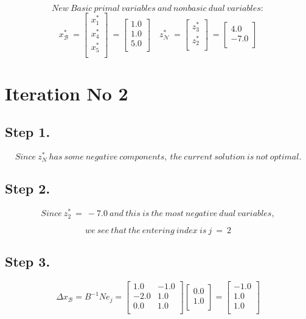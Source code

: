 \documentclass [12pt] {article}
\begin{document}
\[
New\ Basic\ primal\ variables\ and\ nonbasic\ dual\ variables:
\]
\[
x_{\mathcal B}^{*}\ =\begin{bmatrix}
x_{1}^{*} \\x_{4}^{*} \\x_{5}^{*} \\
\end{bmatrix}\ =\begin{bmatrix}
1.0 \\ 1.0 \\ 5.0 \\ 
\end{bmatrix}\quad
z_{\mathcal N}^{*}\ =\begin{bmatrix}
z_{3}^{*} \\z_{2}^{*} \\
\end{bmatrix}\ =\begin{bmatrix}
4.0 \\ -7.0 \\ 
\end{bmatrix}
\]
\section*{Iteration No 2}
\subsection{Step 1.}
\[
Since\ z_\mathit{N}^*\ has\ some\ negative\ components,\ the\ current\ solution\ is\ not\ optimal.
\]
\subsection{Step 2.}
\[
Since\ z_2^*\ = \ -7.0\ and\ this\ is\ the\ most\ negative\ dual\ variables,
\]

\[
we\ see\ that\ the\ entering\ index\ is\  j\ =\ 2
\]
\subsection{Step 3.}
\[
\Delta x_{\mathcal B} = B^{-1} N e_j =
\begin{bmatrix}
1.0 & -1.0 \\ -2.0 & 1.0 \\ 0.0 & 1.0 \\ 
\end{bmatrix}
\begin{bmatrix}
0.0 \\ 1.0 \\ 
\end{bmatrix}
= \begin{bmatrix}
-1.0 \\ 1.0 \\ 1.0 \\ 
\end{bmatrix}
\]
\end{document}
